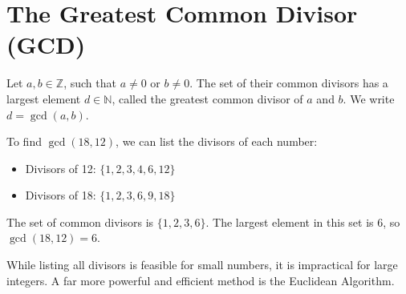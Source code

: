 \section{The Greatest Common Divisor (GCD)}

\begin{definition}
Let $a, b \in \mathbb{Z}$, such that $a \neq 0$ or $b \neq 0$. The set of their common divisors has a largest element $d \in \mathbb{N}$, called the greatest common divisor of $a$ and $b$. We write $d = \gcd(a, b)$.
\end{definition}

\bigskip

\begin{remark}
To find $\gcd(18, 12)$, we can list the divisors of each number:
\begin{itemize}
    \item Divisors of 12: $\{1, 2, 3, 4, 6, 12\}$
    \item Divisors of 18: $\{1, 2, 3, 6, 9, 18\}$
\end{itemize}
The set of common divisors is $\{1, 2, 3, 6\}$. The largest element in this set is $6$, so $\gcd(18, 12) = 6$.
\par
While listing all divisors is feasible for small numbers, it is impractical for large integers. A far more powerful and efficient method is the Euclidean Algorithm.
\end{remark}
